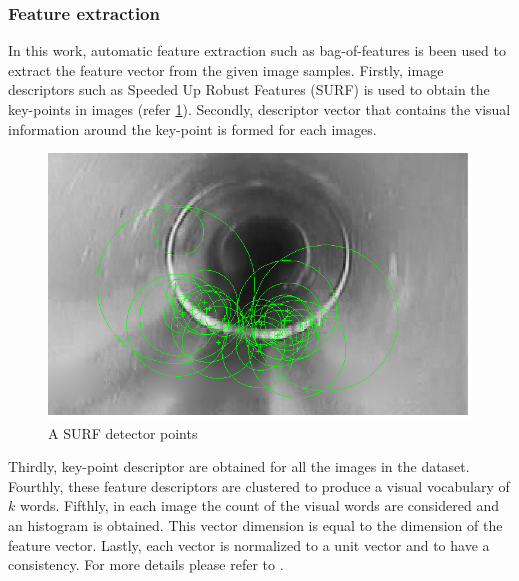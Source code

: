 \documentclass[letterpaper,12pt, onecolumn]{article}%
\begin{document}
\subsubsection*{Feature extraction}
In this work, automatic feature extraction such as bag-of-features is been used to extract the feature vector from the given image samples. Firstly, image descriptors such as Speeded Up Robust Features (SURF) is used to obtain the key-points in images (refer \cref{fig:surfPoints}). Secondly, descriptor vector that contains the visual information around the key-point is formed for each images. 
\begin{figure}[!hbtp]
 	  \centering
 	   \includegraphics[scale=0.5] {surf.png} 
 	   \caption{A SURF detector points}
       \label{fig:surfPoints}
\end{figure}
Thirdly, key-point descriptor are obtained for all the images in the dataset. Fourthly, these feature descriptors are clustered to produce a visual vocabulary of $k$ words. Fifthly, in each image the count of the visual words are considered and an histogram is obtained. This vector dimension is equal to the dimension of the feature vector. Lastly, each vector is normalized to a unit vector and to have a consistency. For more details please refer to \cite{csurka2004visual}.
\end{document}
